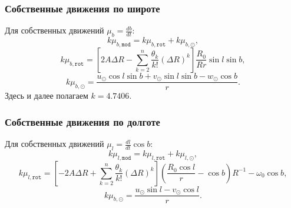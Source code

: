 \documentclass{matmex-diploma-custom}
\begin{document}
\subsubsection{Собственные движения по широте} \label{def_mod_b}
Для собственных движений $\mu_b = \frac{db}{dt}$:
\begin{equation}
        k\mu_{b, \texttt{mod}} = k\mu_{b, \texttt{rot}} + k\mu_{b, \odot},
\end{equation}
\begin{equation}
        k\mu_{b, \texttt{rot}} = \left[ 2A\Delta R - \sum^n_{k = 2} \frac{\theta_k}{k!} \left( \Delta R \right)^k \right] \frac{R_0}{Rr} \sin{l} \sin{b},
\end{equation}
\begin{equation}
        k\mu_{b, \odot} = \frac{u_{\odot}\cos{l}\sin{b} + v_{\odot}\sin{l}\sin{b} - w_{\odot}\cos{b}}{r}.
\end{equation}
Здесь и далее полагаем $k=4.7406$.
\subsubsection{Собственные движения по долготе} \label{def_mod_l}
Для собственных движений $\mu_l = \frac{dl}{dt}\cos{b}$:
\begin{equation}
        k\mu_{l, \texttt{mod}} = k\mu_{l, \texttt{rot}} + k\mu_{l, \odot},
\end{equation}
\begin{equation}
        k\mu_{l, \texttt{rot}} = \left[ -2A\Delta R + \sum^n_{k = 2} \frac{\theta_k}{k!} \left( \Delta R \right)^k \right] \left( \frac{R_0\cos{l}}{r} - \cos{b} \right) R^{-1} - \omega_0 \cos{b},
\end{equation}
\begin{equation}
        k\mu_{b, \odot} = \frac{u_{\odot}\sin{l}- v_{\odot}\cos{l}}{r}.
\end{equation}
\end{document}
